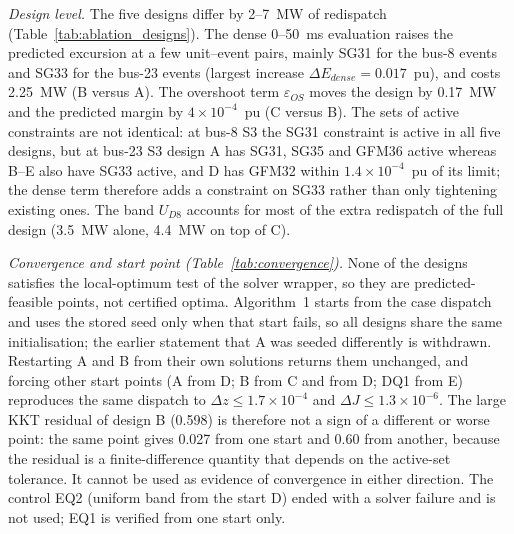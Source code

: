 


\emph{Design level.} The five designs differ by 2--7~MW of redispatch (Table~\ref{tab:ablation_designs}). The dense 0--50~ms evaluation raises the predicted excursion at a few unit--event pairs, mainly SG31 for the bus-8 events and SG33 for the bus-23 events (largest increase $\Delta E_{dense}=0.017$~pu), and costs 2.25~MW (B versus A). The overshoot term $\varepsilon_{OS}$ moves the design by 0.17~MW and the predicted margin by $4\times10^{-4}$~pu (C versus B). The sets of active constraints are not identical: at bus-8 S3 the SG31 constraint is active in all five designs, but at bus-23 S3 design A has SG31, SG35 and GFM36 active whereas B--E also have SG33 active, and D has GFM32 within $1.4\times10^{-4}$~pu of its limit; the dense term therefore adds a constraint on SG33 rather than only tightening existing ones. The band $U_{D8}$ accounts for most of the extra redispatch of the full design (3.5~MW alone, 4.4~MW on top of C).

\emph{Convergence and start point (Table~\ref{tab:convergence}).} None of the designs satisfies the local-optimum test of the solver wrapper, so they are predicted-feasible points, not certified optima. Algorithm~1 starts from the case dispatch and uses the stored seed only when that start fails, so all designs share the same initialisation; the earlier statement that A was seeded differently is withdrawn. Restarting A and B from their own solutions returns them unchanged, and forcing other start points (A from D; B from C and from D; DQ1 from E) reproduces the same dispatch to $\Delta z\le1.7\times10^{-4}$ and $\Delta J\le1.3\times10^{-6}$. The large KKT residual of design B (0.598) is therefore not a sign of a different or worse point: the same point gives 0.027 from one start and 0.60 from another, because the residual is a finite-difference quantity that depends on the active-set tolerance. It cannot be used as evidence of convergence in either direction. The control EQ2 (uniform band from the start D) ended with a solver failure and is not used; EQ1 is verified from one start only.

